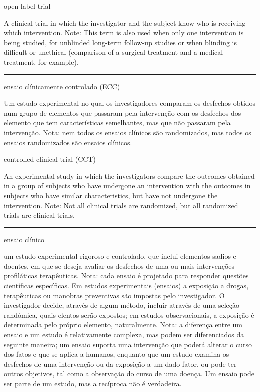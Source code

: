 \documentclass[
]{book}
\begin{document}
open-label trial

A clinical trial in which the investigator and the subject know who is receiving which intervention. Note: This term is also used when only one intervention is being studied, for unblinded long-term follow-up studies or when blinding is difficult or unethical (comparison of a surgical treatment and a medical treatment, for example).

\begin{center}\rule{0.5\linewidth}{0.5pt}\end{center}

ensaio clínicamente controlado (ECC)

Um estudo experimental no qual os investigadores comparam os desfechos obtidos num grupo de elementos que passaram pela intervenção com os desfechos dos elemento que tem características semelhantes, mas que não passaram pela intervenção. Nota: nem todos os ensaios clínicos são randomizados, mas todos os ensaios randomizados são ensaios clínicos.

controlled clinical trial (CCT)

An experimental study in which the investigators compare the outcomes obtained in a group of subjects who have undergone an intervention with the outcomes in subjects who have similar characteristics, but have not undergone the intervention. Note: Not all clinical trials are randomized, but all randomized trials are clinical trials.

\begin{center}\rule{0.5\linewidth}{0.5pt}\end{center}

ensaio clínico

um estudo experimental rigoroso e controlado, que inclui elementos sadios e doentes, em que se deseja avaliar os desfechos de uma ou mais intervenções profiláticas terapêuticas. Nota: cada ensaio é projetado para responder questões científicas específicas. Em estudos experimentais (ensaios) a exposição a drogas, terapêuticas ou manobras preventivas são impostas pelo investigador. O investigador decide, através de algum método, incluir através de uma seleção randômica, quais elentos serão expostos; em estudos observacionais, a exposição é determinada pelo próprio elemento, naturalmente. Nota: a diferença entre um ensaio e um estudo é relativamente complexa, mas podem ser diferenciados da seguinte maneira; um ensaio suporta uma intervenção que poderá alterar o curso dos fatos e que se aplica a humanos, enquanto que um estudo examina os desfechos de uma intervenção ou da exposição a um dado fator, ou pode ter outros objetivos, tal como a observação do curso de uma doença. Um ensaio pode ser parte de um estudo, mas a recíproca não é verdadeira.
\end{document}
